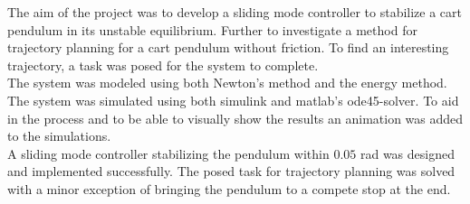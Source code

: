 The aim of the project was to develop a sliding mode controller to stabilize a cart pendulum in its unstable equilibrium. Further to investigate a method for trajectory planning for a cart pendulum without friction. To find an interesting trajectory, a task was posed for the system to complete.\\
The system was modeled using both Newton's method and the energy method. The system was simulated using both simulink and matlab's ode45-solver. To aid in the process and to be able to visually show the results an animation was added to the simulations.\\
A sliding mode controller stabilizing the pendulum within $0.05$ rad was designed and implemented successfully. The posed task for trajectory planning was solved with a minor exception of bringing the pendulum to a compete stop at the end.